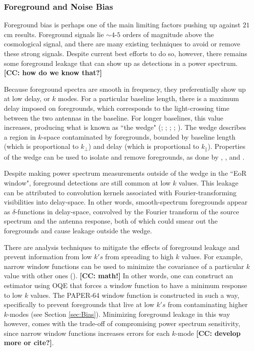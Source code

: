 \documentclass[preprint2,numberedappendix,tighten]{aastex6}  %
\newcommand{\cc}[1]{{\color{purple} \textbf{[CC: #1]}}}
\begin{document}
\subsubsection{Foreground and Noise Bias}
\label{sec:BiasTypes}

Foreground bias is perhaps one of the main limiting factors pushing up against $21$ cm results. Foreground signals lie $\sim4$-$5$ orders of magnitude above the cosmological signal, and there are many existing techniques to avoid or remove these strong signals. Despite current best efforts to do so, however, there remains some foreground leakage that can show up as detections in a power spectrum. \cc{how do we know that?} 

Because foreground spectra are smooth in frequency, they preferentially show up at low delay, or $k$ modes. For a particular baseline length, there is a maximum delay imposed on foregrounds, which corresponds to the light-crossing time between the two antennas in the baseline. For longer baselines, this value increases, producing what is known as ``the wedge" (\citealt{parsons_et_al2012b}; \citealt{liu_et_al2014a}; \citealt{liu_et_al2014b}; \citealt{vedantham_et_al2012}; \citealt{thyagarajan_et_al2013}). The wedge describes a region in $k$-space contaminated by foregrounds, bounded by baseline length (which is proportional to $k_{\perp}$) and delay (which is proportional to $k_{\parallel}$). Properties of the wedge can be used to isolate and remove foregrounds, as done by \citet{ali_et_al2015}, \citet{parsons_et_al2014}, and \citet{jacobs_et_al2015}.

Despite making power spectrum measurements outside of the wedge in the ``EoR window", foreground detections are still common at low $k$ values. This leakage can be attributed to convolution kernels associated with Fourier-transforming visibilities into delay-space. In other words, smooth-spectrum foregrounds appear as $\delta$-functions in delay-space, convolved by the Fourier transform of the source spectrum and the antenna response, both of which could smear out the foregrounds and cause leakage outside the wedge.

There are analysis techniques to mitigate the effects of foreground leakage and prevent information from low $k's$ from spreading to high $k$ values. For example, narrow window functions can be used to minimize the covariance of a particular $k$ value with other ones (\citealt{liu_et_al2014b}). \cc{math!} In other words, one can construct an estimator using OQE that forces a window function to have a minimum response to low $k$ values. The PAPER-64 window function is constructed in such a way, specifically to prevent foregrounds that live at low $k's$ from contaminating higher $k$-modes (see Section \ref{sec:Bias}). Minimizing foreground leakage in this way however, comes with the trade-off of compromising power spectrum sensitivity, since narrow window functions increases errors for each $k$-mode \cc{develop more or cite?}. 
\end{document}
